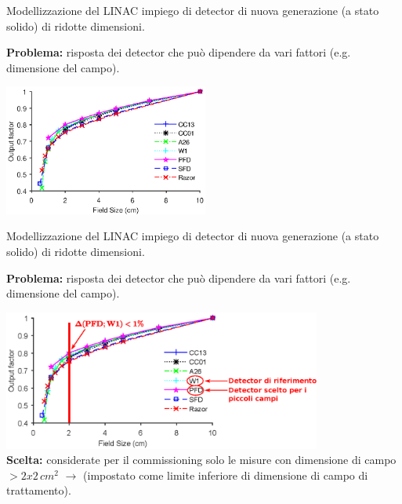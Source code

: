 \documentclass{beamer}
\begin{document}
\begin{frame}[t]{Modellizzazione del LINAC}
\footnotesize
{} impiego di detector di nuova generazione (a stato solido) di ridotte dimensioni.\\ \vspace{.5cm}

\alert{\bf Problema:} risposta dei detector che può dipendere da vari fattori (e.g. dimensione del campo).\\ \vspace{.3cm}

\includegraphics[height=4.3cm]{../cap2/OF_plots/OFSmall.eps}

\end{frame}


\begin{frame}[t]{Modellizzazione del LINAC}
\footnotesize
{} impiego di detector di nuova generazione (a stato solido) di ridotte dimensioni.\\ \vspace{.5cm}

\alert{\bf Problema:} risposta dei detector che può dipendere da vari fattori (e.g. dimensione del campo).\\ \vspace{.3cm}

\includegraphics[height=4.6cm]{./img/OF_MOD.eps}\\\vspace{.2cm}
{\scriptsize \color{Dgreen} \textbf{Scelta:} considerate per il commissioning solo le misure con dimensione di campo $> 2x2\,cm^2$ $\rightarrow$ (impostato come limite inferiore di dimensione di campo di trattamento).}

\end{frame}
\end{document}
